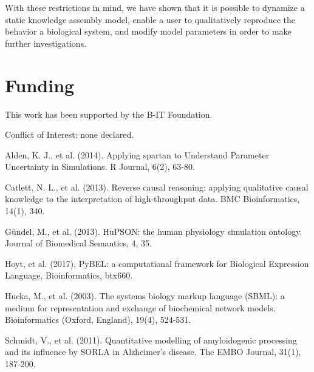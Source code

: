 \documentclass{bioinfo}
\begin{document}
With these restrictions in mind, we have shown that it is possible to dynamize a 
static knowledge assembly model, enable a user to qualitatively reproduce the behavior a biological system, and modify model parameters in order to make further investigations. 

\section*{Funding}

This work has been supported by the B-IT Foundation.

Conflict of Interest: none declared.

\begin{thebibliography}{}

Alden, K. J., et al. (2014). Applying spartan to Understand Parameter Uncertainty in Simulations. R Journal, 6(2), 63-80.

Catlett, N. L., et al. (2013). Reverse causal reasoning: applying qualitative causal knowledge to the interpretation of high-throughput data. BMC Bioinformatics, 14(1), 340.

G{\"u}ndel, M., et al. (2013). HuPSON: the human physiology simulation ontology. Journal of Biomedical Semantics, 4, 35. 

Hoyt, et al. (2017), PyBEL: a computational framework for Biological Expression Language, Bioinformatics, btx660.

Hucka, M., et al. (2003). The systems biology markup language (SBML): a medium for representation and exchange of biochemical network models. Bioinformatics (Oxford, England), 19(4), 524-531.

Schmidt, V., et al. (2011). Quantitative modelling of amyloidogenic processing and its influence by SORLA in Alzheimer's disease. The EMBO Journal, 31(1), 187-200.

\end{thebibliography}
\end{document}
